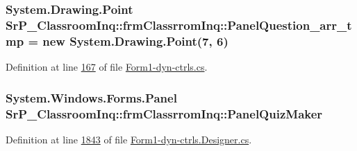 \hypertarget{class_sr_p___classroom_inq_1_1frm_classrrom_inq_a3e546b9b0c603a788d0316efe572c960}{
\subsubsection[{\-Panel\-Question\-\_\-arr\-\_\-tmp}]{\setlength{\rightskip}{0pt plus 5cm}\-System.\-Drawing.\-Point {\bf \-Sr\-P\-\_\-\-Classroom\-Inq\-::frm\-Classrrom\-Inq\-::\-Panel\-Question\-\_\-arr\-\_\-tmp} = new \-System.\-Drawing.\-Point(7, 6)}}
\label{class_sr_p___classroom_inq_1_1frm_classrrom_inq_a3e546b9b0c603a788d0316efe572c960}


\-Definition at line \hyperlink{_form1-dyn-ctrls_8cs_source_l00167}{167} of file \hyperlink{_form1-dyn-ctrls_8cs_source}{\-Form1-\/dyn-\/ctrls.\-cs}.

\hypertarget{class_sr_p___classroom_inq_1_1frm_classrrom_inq_a1dd9af4cd0caad174e59e9038dcb8868}{
\subsubsection[{\-Panel\-Quiz\-Maker}]{\setlength{\rightskip}{0pt plus 5cm}\-System.\-Windows.\-Forms.\-Panel {\bf \-Sr\-P\-\_\-\-Classroom\-Inq\-::frm\-Classrrom\-Inq\-::\-Panel\-Quiz\-Maker}}}
\label{class_sr_p___classroom_inq_1_1frm_classrrom_inq_a1dd9af4cd0caad174e59e9038dcb8868}


\-Definition at line \hyperlink{_form1-dyn-ctrls_8_designer_8cs_source_l01843}{1843} of file \hyperlink{_form1-dyn-ctrls_8_designer_8cs_source}{\-Form1-\/dyn-\/ctrls.\-Designer.\-cs}.

